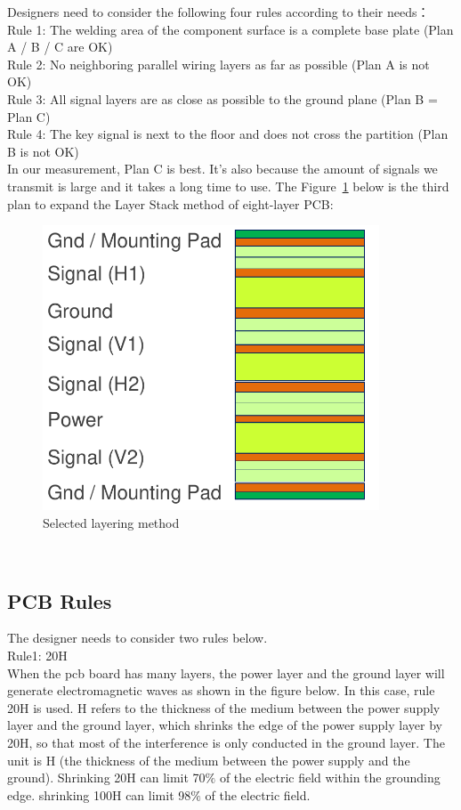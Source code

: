 Designers need to consider the following four rules according to their needs：
\\
Rule 1: The welding area of the component surface is a complete base plate (Plan A / B / C are OK)
\\
Rule 2: No neighboring parallel wiring layers as far as possible (Plan A is not OK)
\\
Rule 3: All signal layers are as close as possible to the ground plane (Plan B = Plan C)
\\
Rule 4: The key signal is next to the floor and does not cross the partition (Plan B is not OK)
\\
In our measurement, Plan C is best. It’s also because the amount of signals we transmit is large and it takes a long time to use.
The Figure~\ref{fig:6.11} below is the third plan to expand the Layer Stack method of eight-layer PCB:

\begin{figure}[!ht]
	\centering
	\includegraphics[width=10cm]{grafiken/6.11.pdf}
	\caption{Selected layering method} 
	\label{fig:6.11}
\end{figure}
\FloatBarrier
\\

\subsection{PCB Rules}
\label{sec:PCB Rules}
The designer needs to consider two rules below. 
\\
Rule1: 20H
\\
When the pcb board has many layers, the power layer and the ground layer will generate electromagnetic waves as shown in the figure below. In this case, rule 20H is used. H refers to the thickness of the medium between the power supply layer and the ground layer, which shrinks the edge of the power supply layer by 20H, so that most of the interference is only conducted in the ground layer. The unit is H (the thickness of the medium between the power supply and the ground). Shrinking 20H can limit 70$\%$ of the electric field within the grounding edge. shrinking 100H can limit 98$\%$ of the electric field.
 
